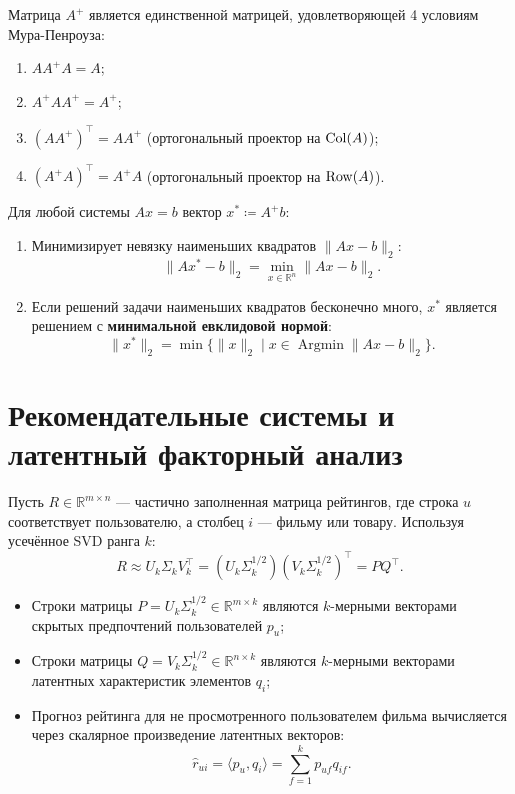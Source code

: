     \begin{theorem}
Матрица $A^+$ является единственной матрицей, удовлетворяющей 4 условиям Мура-Пенроуза:
\begin{enumerate}
    \item $A A^+ A = A$;
    \item $A^+ A A^+ = A^+$;
    \item $(A A^+)^\top = A A^+$ (ортогональный проектор на $\operatorname{Col}(A)$);
    \item $(A^+ A)^\top = A^+ A$ (ортогональный проектор на $\operatorname{Row}(A)$).
\end{enumerate}
    \end{theorem}

    \begin{theorem}
Для любой системы $Ax = b$ вектор $x^* \coloneqq A^+ b$:
\begin{enumerate}
    \item Минимизирует невязку наименьших квадратов $\|Ax - b\|_2$:
    \[ \|A x^* - b\|_2 = \min_{x \in \mathbb{R}^n} \|A x - b\|_2. \]
    \item Если решений задачи наименьших квадратов бесконечно много, $x^*$ является решением с \textbf{минимальной
    евклидовой нормой}:
    \[ \|x^*\|_2 = \min \{ \|x\|_2 \mid x \in \operatorname{Argmin} \|Ax - b\|_2 \}. \]
\end{enumerate}
    \end{theorem}

    \section{Рекомендательные системы и латентный факторный анализ}

    Пусть $R \in \mathbb{R}^{m \times n}$ — частично заполненная матрица рейтингов, где строка $u$ соответствует
    пользователю, а столбец $i$ — фильму или товару.
    Используя усечённое SVD ранга $k$:
    \[ R \approx U_k \Sigma_k V_k^\top = (U_k \Sigma_k^{1/2}) (V_k \Sigma_k^{1/2})^\top = P Q^\top. \]
    \begin{itemize}
        \item Строки матрицы $P = U_k \Sigma_k^{1/2} \in \mathbb{R}^{m \times k}$ являются $k$-мерными векторами скрытых
        предпочтений пользователей $p_u$;
        \item Строки матрицы $Q = V_k \Sigma_k^{1/2} \in \mathbb{R}^{n \times k}$ являются $k$-мерными векторами 
        латентных характеристик элементов $q_i$;
        \item Прогноз рейтинга для не просмотренного пользователем фильма вычисляется через скалярное произведение 
        латентных  векторов: \[ \hat{r}_{ui} = \langle p_u, q_i \rangle = \sum_{f=1}^k p_{uf} q_{if}. \]
    \end{itemize}